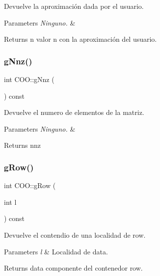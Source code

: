 Devuelve la aproximación dada por el usuario. 


\begin{DoxyParams}{Parameters}
{\em Ninguno.} & \\
\hline
\end{DoxyParams}
\begin{DoxyReturn}{Returns}
n valor n con la aproximación del usuario. 
\end{DoxyReturn}
\hypertarget{class_c_o_o_a579bd9ac3578ef00a72df67563742025}{}\label{class_c_o_o_a579bd9ac3578ef00a72df67563742025} 
\subsubsection{\texorpdfstring{g\+Nnz()}{gNnz()}}
{\footnotesize\ttfamily int C\+O\+O\+::g\+Nnz (\begin{DoxyParamCaption}{ }\end{DoxyParamCaption}) const\hspace{0.3cm}{\ttfamily [inline]}}



Devuelve el numero de elementos de la matriz. 


\begin{DoxyParams}{Parameters}
{\em Ninguno.} & \\
\hline
\end{DoxyParams}
\begin{DoxyReturn}{Returns}
nnz 
\end{DoxyReturn}
\hypertarget{class_c_o_o_a6ad2d0b5f295069c1dc0c31662afe336}{}\label{class_c_o_o_a6ad2d0b5f295069c1dc0c31662afe336} 
\subsubsection{\texorpdfstring{g\+Row()}{gRow()}}
{\footnotesize\ttfamily int C\+O\+O\+::g\+Row (\begin{DoxyParamCaption}\item[{int}]{l }\end{DoxyParamCaption}) const\hspace{0.3cm}{\ttfamily [inline]}}



Devuelve el contendio de una localidad de row. 


\begin{DoxyParams}{Parameters}
{\em l} & Localidad de data. \\
\hline
\end{DoxyParams}
\begin{DoxyReturn}{Returns}
data componente del contenedor row. 
\end{DoxyReturn}
\hypertarget{class_c_o_o_a33a3d395ce41eef9d071615df01d721f}{}\label{class_c_o_o_a33a3d395ce41eef9d071615df01d721f} 
